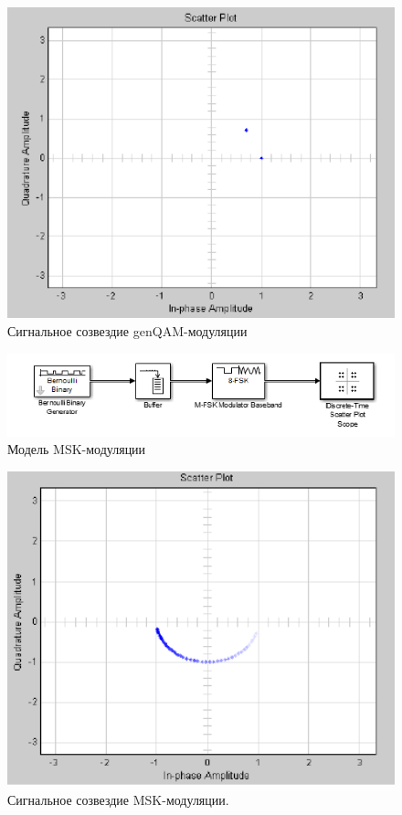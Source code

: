 \begin{figure}[H]
\includegraphics[width=150mm, scale = 0.9]{lab9/9_28}
   \caption{Сигнальное созвездие genQAM-модуляции}
\end{figure}



\begin{figure}[H]
\includegraphics[width=150mm, scale = 0.9]{lab9/9_29}
   \caption{Модель MSK-модуляции}
\end{figure}



\begin{figure}[H]
\includegraphics[width=150mm, scale = 0.9]{lab9/9_30}
   \caption{Сигнальное созвездие MSK-модуляции.}
\end{figure}


